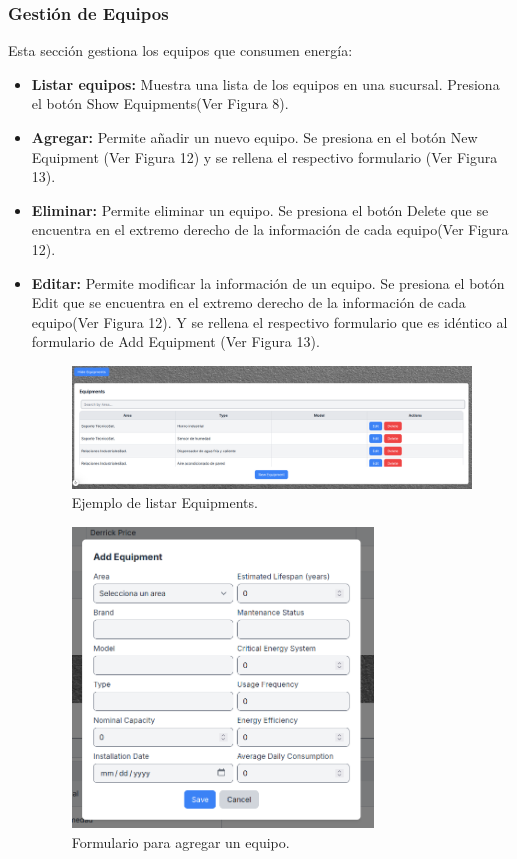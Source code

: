 \documentclass{article}
\begin{document}
\subsubsection{Gestión de Equipos}
Esta sección gestiona los equipos que consumen energía:

\begin{itemize}
    \item \textbf{Listar equipos:} Muestra una lista de los equipos en una sucursal. Presiona el botón Show Equipments(Ver Figura 8).
    \item \textbf{Agregar:} Permite añadir un nuevo equipo. Se presiona en el botón New Equipment (Ver Figura 12) y se rellena el respectivo formulario (Ver Figura 13).
    \item \textbf{Eliminar:} Permite eliminar un equipo. Se presiona el botón Delete que se encuentra en el extremo derecho de la información de cada equipo(Ver Figura 12).
    \item \textbf{Editar:} Permite modificar la información de un equipo. Se presiona el botón Edit que se encuentra en el extremo derecho de la información de cada 
    equipo(Ver Figura 12). Y se rellena el respectivo formulario que es idéntico al formulario de Add Equipment (Ver Figura 13).
    
    \begin{figure}[h!]
        \centering
        \includegraphics[width= 14cm]{list_equipments.png}
        \caption{Ejemplo de listar Equipments.}
    \end{figure}

    \begin{figure}[h!]
        \centering
        \includegraphics[width= 8cm]{add_equipment.png}
        \caption{Formulario para agregar un equipo.}
    \end{figure}

\end{itemize}
\end{document}
